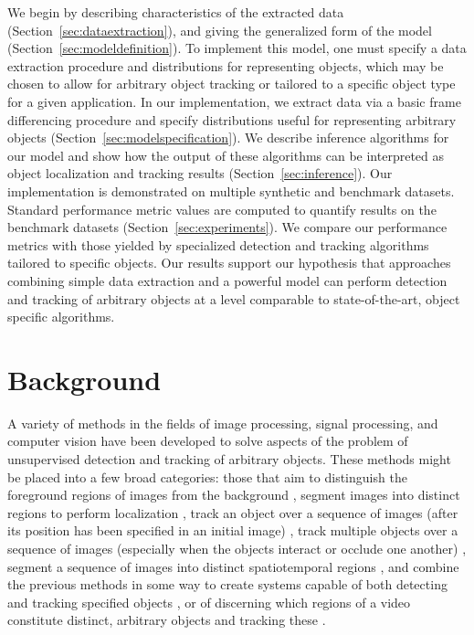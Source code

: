 \documentclass[twocolumn, final]{svjour3}
\begin{document}
We begin by describing characteristics of the extracted data (Section~\ref{sec:dataextraction}), and giving the generalized form of the model (Section~\ref{sec:modeldefinition}). To implement this model, one must specify a data extraction procedure and distributions for representing objects, which may be chosen to allow for arbitrary object tracking or tailored to a specific object type for a given application. In our implementation, we extract data via a basic frame differencing procedure and specify distributions useful for representing arbitrary objects (Section~\ref{sec:modelspecification}). We describe inference algorithms for our model and show how the output of these algorithms can be interpreted as object localization and tracking results (Section~\ref{sec:inference}). Our implementation is demonstrated on multiple synthetic and benchmark datasets. Standard performance metric values are computed to quantify results on the benchmark datasets (Section~\ref{sec:experiments}). We compare our performance metrics with those yielded by specialized detection and tracking algorithms tailored to specific objects. Our results support our hypothesis that approaches combining simple data extraction and a powerful model can perform detection and tracking of arbitrary objects at a level comparable to state-of-the-art, object specific algorithms.




\section{Background}
\label{sec:priorwork}

A variety of methods in the fields of image processing, signal processing, and computer vision have been developed to solve aspects of the problem of unsupervised detection and tracking of arbitrary objects. These methods might be placed into a few broad categories: those that aim to distinguish the foreground regions of images from the background \cite{hong2007real,chien2002efficient, zhang2007moving, kim2002fast}, segment images into distinct regions to perform localization \cite{jain1997object, fei2005bayesian, sivic2005discovering}, track an object over a sequence of images (after its position has been specified in an initial image) \cite{raja_1998, mckenna_1999, jepson_2003, comaniciu_2003, perez_2002}, track multiple objects over a sequence of images (especially when the objects interact or occlude one another) \cite{senior2006appearance, cucchiara2004probabilistic, zhou2003background, han_2004, mckenna2000tracking, dockstader2001multiple}, segment a sequence of images into distinct spatiotemporal regions \cite{brox2003unsupervised, sista2000unsupervised, wang1998unsupervised}, and combine the previous methods in some way to create systems capable of both detecting and tracking specified objects \cite{Okuma04aboosted,eth_biwi_00633,4036928, khan_2004, leibe2008coupled}, or of discerning which regions of a video constitute distinct, arbitrary objects and tracking these \cite{brostow2006unsupervised, brox2010object, fragkiadaki2011detection, pece_2002,paragios2000geodesic}.
\end{document}
